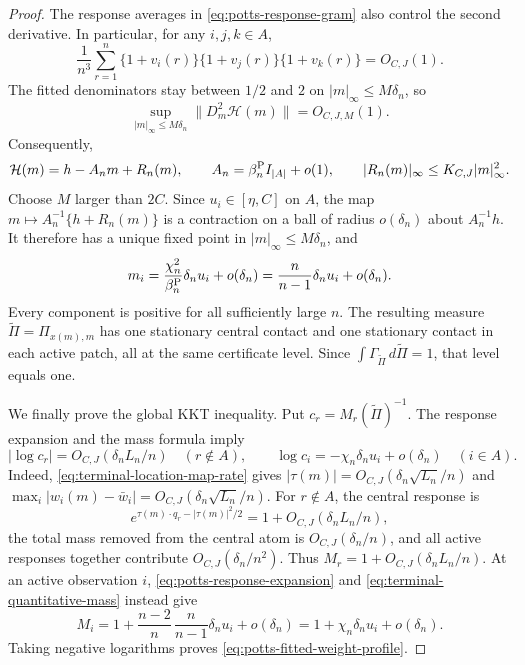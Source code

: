 \begin{proof}
The response averages in \eqref{eq:potts-response-gram} also control the
second derivative.  In particular,
for any \(i,j,k\in A\),
\[
 \frac1{n^3}\sum_{r=1}^n
  \{1+v_i(r)\}\{1+v_j(r)\}\{1+v_k(r)\}=O_{C,J}(1).
\]
The fitted denominators stay between \(1/2\) and \(2\) on
\(|m|_\infty\le M\delta_n\), so
\begin{equation}
\label{eq:terminal-mass-second-derivative}
 \sup_{|m|_\infty\le M\delta_n}
 \|D_m^2\mathcal H(m)\|=O_{C,J,M}(1).
\end{equation}
Consequently,
\begin{equation}
\label{eq:potts-local-program}
 \mathcal H(m)=h-A_nm+R_n(m),
 \qquad
 A_n=\beta_n^{\rm P}I_{|A|}+o(1),
 \qquad
 |R_n(m)|_\infty\le K_{C,J}|m|_\infty^2.
\end{equation}
Choose \(M\) larger than \(2C\).  Since \(u_i\in[\eta,C]\) on \(A\),
the map
\(m\mapsto A_n^{-1}\{h+R_n(m)\}\) is a contraction on a ball of radius
\(o(\delta_n)\) about \(A_n^{-1}h\).  It therefore has a unique fixed
point in \(|m|_\infty\le M\delta_n\), and
\begin{equation}
\label{eq:terminal-quantitative-mass}
 m_i
 =\frac{\chi_n^2}{\beta_n^{\rm P}}\delta_nu_i+o(\delta_n)
 =\frac{n}{n-1}\delta_nu_i+o(\delta_n).
\end{equation}
Every component is positive for all sufficiently large \(n\).  The
resulting measure \(\widetilde\Pi=\Pi_{x(m),m}\) has one stationary central
contact and one stationary contact in each active patch, all at the same
certificate level.  Since
\(\int\Gamma_{\widetilde\Pi}\,d\widetilde\Pi=1\), that level equals one.

We finally prove the global KKT inequality.  Put
\(c_r=M_r(\widetilde\Pi)^{-1}\).  The response expansion and the mass
formula imply
\begin{equation}
\label{eq:potts-fitted-weight-profile}
 |\log c_r|=O_{C,J}(\delta_nL_n/n)\quad(r\notin A),
 \qquad
 \log c_i=-\chi_n\delta_nu_i+o(\delta_n)\quad(i\in A).
\end{equation}
Indeed, \eqref{eq:terminal-location-map-rate} gives
\(|\tau(m)|=O_{C,J}(\delta_n\sqrt{L_n}/n)\) and
\(\max_i|w_i(m)-\bar w_i|=O_{C,J}(\delta_n\sqrt{L_n}/n)\).
For \(r\notin A\), the central response is
\[
 e^{\tau(m)\cdot q_r-|\tau(m)|^2/2}
 =1+O_{C,J}(\delta_nL_n/n),
\]
the total mass removed from the central atom is \(O_{C,J}(\delta_n/n)\),
and all active responses together contribute \(O_{C,J}(\delta_n/n^2)\).
Thus \(M_r=1+O_{C,J}(\delta_nL_n/n)\).  At an active observation \(i\),
\eqref{eq:potts-response-expansion} and
\eqref{eq:terminal-quantitative-mass} instead give
\[
 M_i
 =1+\frac{n-2}{n}\,
      \frac{n}{n-1}\delta_nu_i+o(\delta_n)
 =1+\chi_n\delta_nu_i+o(\delta_n).
\]
Taking negative logarithms proves
\eqref{eq:potts-fitted-weight-profile}.


\end{proof}
